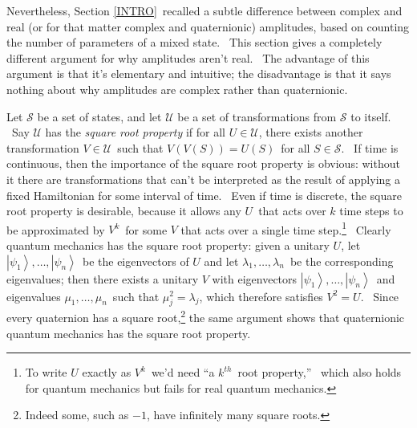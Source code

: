 \documentclass[12pt]{article}%
\begin{document}
Nevertheless, Section \ref{INTRO}\ recalled a subtle difference between
complex and real (or for that matter complex and quaternionic) amplitudes,
based on counting the number of parameters of a mixed state. \ This section
gives a completely different argument for why amplitudes aren't real. \ The
advantage of this argument is that it's elementary and intuitive; the
disadvantage is that it says nothing about why amplitudes are complex rather
than quaternionic.

Let $\mathcal{S}$ be a set of states, and let $\mathcal{U}$ be a set of
transformations from $\mathcal{S}$ to itself. \ Say $\mathcal{U}$ has the
\textit{square root property} if for all $U\in\mathcal{U}$, there exists
another transformation $V\in\mathcal{U}$\ such that $V\left(  V\left(
S\right)  \right)  =U\left(  S\right)  $\ for all $S\in\mathcal{S}$. \ If time
is continuous, then the importance of the square root property is obvious:
without it there are transformations that can't be interpreted as the result
of applying a fixed Hamiltonian for some interval of time. \ Even if time is
discrete, the square root property is desirable, because it allows any
$U$\ that acts over $k$ time steps to be approximated by $V^{k}$\ for some $V$
that acts over a single time step.\footnote{To write $U$ exactly as $V^{k}%
$\ we'd need \textquotedblleft a $k^{th}$\ root property,\textquotedblright
\ which also holds for quantum mechanics but fails for real quantum
mechanics.} \ Clearly quantum mechanics has the square root property: given a
unitary $U$, let $\left\vert \psi_{1}\right\rangle ,\ldots,\left\vert \psi
_{n}\right\rangle $\ be the eigenvectors of $U$ and let $\lambda_{1}%
,\ldots,\lambda_{n}$\ be the corresponding eigenvalues; then there exists a
unitary $V$ with eigenvectors $\left\vert \psi_{1}\right\rangle ,\ldots
,\left\vert \psi_{n}\right\rangle $\ and eigenvalues $\mu_{1},\ldots,\mu_{n}%
$\ such that $\mu_{j}^{2}=\lambda_{j}$, which therefore satisfies $V^{2}=U$.
\ Since every quaternion has a square root,\footnote{Indeed some, such as
$-1$, have infinitely many square roots.} the same argument shows that
quaternionic quantum mechanics has the square root property.
\end{document}
